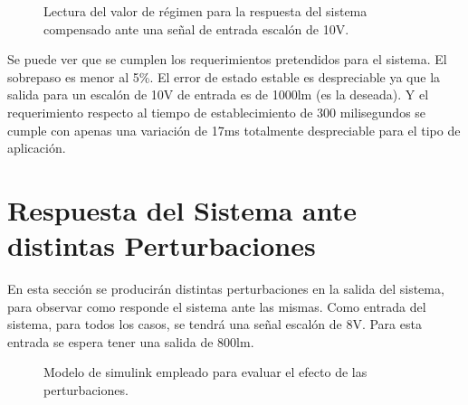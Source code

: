 \documentclass[a4paper,11pt]{article}
\begin{document}
 \begin{figure}[H] %
	\caption{Lectura del valor de régimen para la respuesta del sistema compensado ante una señal de entrada escalón de 10V.}
	\label{fig:FTlazoc_comp_step+vf}
\end{figure} 

Se puede ver que se cumplen los requerimientos pretendidos para el sistema. El sobrepaso es menor al 5\%. El error de estado estable es despreciable ya que la salida para un escalón de 10V de entrada es de 1000lm (es la deseada). Y el requerimiento respecto al tiempo de establecimiento de 300 milisegundos se cumple con apenas una variación de 17ms totalmente despreciable para el tipo de aplicación.


\section{Respuesta del Sistema ante distintas Perturbaciones}

En esta sección se producirán distintas perturbaciones en la salida del sistema, para observar como responde el sistema ante las mismas. Como entrada del sistema, para todos los casos, se tendrá una señal escalón de 8V. Para esta entrada se espera tener una salida de 800lm.

 \begin{figure}[H] %
	\caption{Modelo de simulink empleado para evaluar el efecto de las perturbaciones.}
	\label{fig:slink_comp_pert}
\end{figure} 
\end{document}
